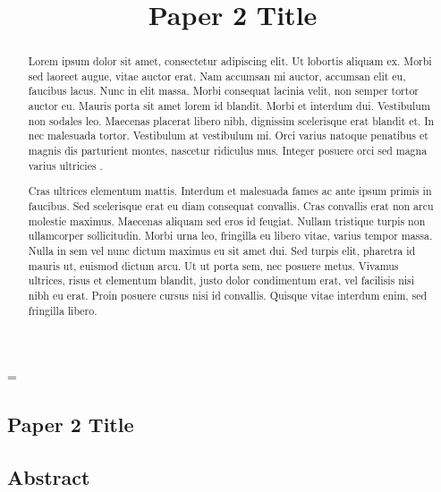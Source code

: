 \emergencystretch=\maxdimen
{}

\begin{refsection}

\title{Paper 2 Title}


\chapter{Paper 2 Title}

\vspace{-2cm}

\section{Abstract}

\vspace{-0.5em}
\begin{abstract}

Lorem ipsum dolor sit amet, consectetur adipiscing elit. Ut lobortis aliquam ex. Morbi sed laoreet augue, vitae auctor erat. Nam accumsan mi auctor, accumsan elit eu, faucibus lacus. Nunc in elit massa. Morbi consequat lacinia velit, non semper tortor auctor eu. Mauris porta sit amet lorem id blandit. Morbi et interdum dui. Vestibulum non sodales leo. Maecenas placerat libero nibh, dignissim scelerisque erat blandit et. In nec malesuada tortor. Vestibulum at vestibulum mi. Orci varius natoque penatibus et magnis dis parturient montes, nascetur ridiculus mus. Integer posuere orci sed magna varius ultricies \cite{example1}.

Cras ultrices elementum mattis. Interdum et malesuada fames ac ante ipsum primis in faucibus. Sed scelerisque erat eu diam consequat convallis. Cras convallis erat non arcu molestie maximus. Maecenas aliquam sed eros id feugiat. Nullam tristique turpis non ullamcorper sollicitudin. Morbi urna leo, fringilla eu libero vitae, varius tempor massa. Nulla in sem vel nunc dictum maximus eu sit amet dui. Sed turpis elit, pharetra id mauris ut, euismod dictum arcu. Ut ut porta sem, nec posuere metus. Vivamus ultrices, risus et elementum blandit, justo dolor condimentum erat, vel facilisis nisi nibh eu erat. Proin posuere cursus nisi id convallis. Quisque vitae interdum enim, sed fringilla libero.

\end{abstract}


\end{refsection}
